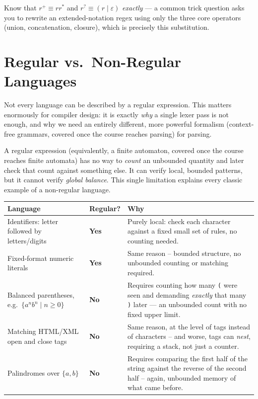 \documentclass[full-course-notes.tex]{subfiles}
\begin{document}
\begin{examfocus}
Know that $r^{+} \equiv rr^{*}$ and $r^{?} \equiv (r \mid \varepsilon)$ \emph{exactly} --- a
common trick question asks you to rewrite an extended-notation regex using only the three core
operators (union, concatenation, closure), which is precisely this substitution.
\end{examfocus}

\section{Regular vs.\ Non-Regular Languages}
\label{sec:l4-regular-vs-nonregular}

\dbtag Not every language can be described by a regular expression. This matters enormously for
compiler design: it is exactly \emph{why} a single lexer pass is not enough, and why we need an
entirely different, more powerful formalism (context-free grammars, covered once the course
reaches parsing) for parsing.

\begin{coreidea}
A regular expression (equivalently, a finite automaton, covered once the course reaches finite
automata) has no way to \emph{count} an unbounded quantity and later check that count against
something else. It can verify local, bounded patterns, but it cannot verify \emph{global
balance}. This single limitation explains every classic example of a non-regular language.
\end{coreidea}

\begin{center}
\renewcommand{\arraystretch}{1.4}
\begin{tabularx}{\textwidth}{@{}X l X@{}}
\toprule
\textbf{Language} & \textbf{Regular?} & \textbf{Why} \\
\midrule
Identifiers: letter followed by letters/digits & \textbf{Yes} & Purely local: check each
character against a fixed small set of rules, no counting needed. \\
Fixed-format numeric literals & \textbf{Yes} & Same reason -- bounded structure, no unbounded
counting or matching required. \\
Balanced parentheses, e.g.\ $\{a^{n}b^{n} \mid n \ge 0\}$ & \textbf{No} & Requires counting how
many \texttt{(} were seen and demanding \emph{exactly} that many \texttt{)} later --- an
unbounded count with no fixed upper limit. \\
Matching HTML/XML open and close tags & \textbf{No} & Same reason, at the level of tags instead
of characters -- and worse, tags can \emph{nest}, requiring a stack, not just a counter. \\
Palindromes over $\{a,b\}$ & \textbf{No} & Requires comparing the first half of the string
against the reverse of the second half -- again, unbounded memory of what came before. \\
\bottomrule
\end{tabularx}
\end{center}
\end{document}
